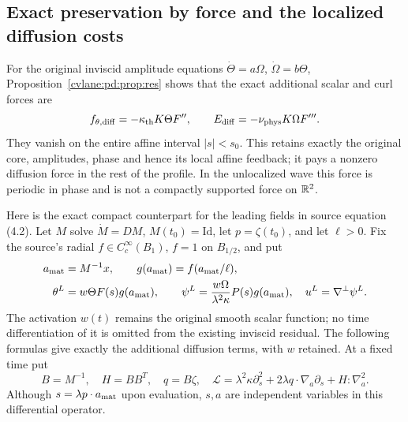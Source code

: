 \subsection{Exact preservation by force and the localized diffusion costs}

For the original inviscid amplitude equations $\dot\Theta=a\Omega$,
$\dot\Omega=b\Theta$, Proposition~\ref{cvlane:pd:prop:res} shows that the exact
additional scalar and curl forces are
\begin{equation}\label{cvlane:pd:eq:repair}
 f_{\theta,\mathrm{diff}}=-\kappa_{\rm th} K\Theta F'',\qquad
 E_{\mathrm{diff}}=-\nu_{\rm phys} K\Omega F'''.
\end{equation}
They vanish on the entire affine interval $|s|<s_0$. This retains exactly
the original core, amplitudes, phase and hence its local affine feedback;
it pays a nonzero diffusion force in the rest of the profile. In the
unlocalized wave this force is periodic in phase and is not a compactly
supported force on $\mathbb R^2$.

Here is the exact compact counterpart for the leading fields in source
equation (4.2). Let $M$ solve $\dot M=DM$, $M(t_0)=\mathrm{Id}$, let
$p=\zeta(t_0)$, and let $\ell>0$. Fix the source's radial
$f\in C_c^\infty(B_1)$, $f=1$ on $B_{1/2}$, and put
\begin{align}\label{cvlane:pd:eq:localized}
 a_{\rm mat}&=M^{-1}x,\qquad g(a_{\rm mat})=f(a_{\rm mat}/\ell),\notag\\
 \theta^L&=w\Theta F(s)g(a_{\rm mat}),\qquad
 \psi^L=\frac{w\Omega}{\lambda^2\kappa}P(s)g(a_{\rm mat}),\quad
 u^L=\nabla^\perp\psi^L.
\end{align}
The activation $w(t)$ remains the original smooth scalar function; no
time differentiation of it is omitted from the existing inviscid
residual. The following formulas give exactly the additional diffusion
terms, with $w$ retained.
At a fixed time put
\begin{equation}\label{cvlane:pd:eq:L}
 B=M^{-1},\quad H=BB^T,\quad q=B\zeta,\quad
 \mathscr L=\lambda^2\kappa\partial_s^2+
            2\lambda q\cdot\nabla_a\partial_s+H:\nabla_a^2.
\end{equation}
Although $s=\lambda p\cdot a_{\rm mat}$ upon evaluation, $s,a$ are
independent variables in this differential operator.

